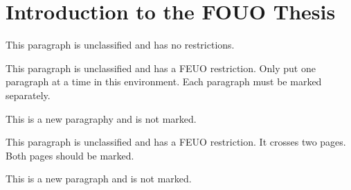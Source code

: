 \chapter{Introduction to the FOUO Thesis}

This paragraph is unclassified and has no restrictions.
\lipsum[2-3] %

\begin{smark}[(FEUO)]
This paragraph is unclassified and has a FEUO restriction.
Only put one paragraph at a time in this environment.
Each paragraph must be marked separately.
\lipsum[4] %
\end{smark}

This is a new paragraphy and is not marked.
\lipsum[3] %

\newpage
\lipsum[1-3] %

\begin{smark}[(FEUO)]
This paragraph is unclassified and has a FEUO restriction.
It crosses two pages. Both pages should be marked.
\lipsum[4] %
\end{smark}


This is a new paragraph and is not marked.
\lipsum[3] %
